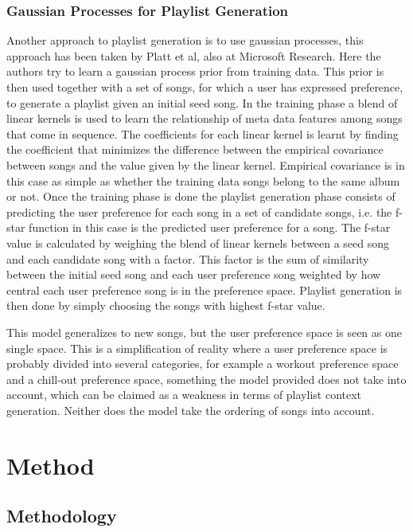 \documentclass[a4paper,11pt]{kth-mag}
\begin{document}
\section{Gaussian Processes for Playlist Generation}
Another approach to playlist generation is to use gaussian processes, this approach has been taken by Platt et al, also at Microsoft Research. Here the authors try to learn a gaussian process prior from training data. This prior is then used together with a set of songs, for which a user has expressed preference, to generate a playlist given an initial seed song. In the training phase a blend of linear kernels is used to learn the relationship of meta data features among songs that come in sequence. The coefficients for each linear kernel is learnt by finding the coefficient that minimizes the difference between the empirical covariance between songs and the value given by the linear kernel. Empirical covariance is in this case as simple as whether the training data songs belong to the same album or not. Once the training phase is done the playlist generation phase consists of predicting the user preference for each song in a set of candidate songs, i.e. the f-star function in this case is the predicted user preference for a song. The f-star value is calculated by weighing the blend of linear kernels between a seed song and each candidate song with a factor. This factor is the sum of similarity between the initial seed song and each user preference song weighted by how central each user preference song is in the preference space. Playlist generation is then done by simply choosing the songs with highest f-star value\cite{platt2001learning}.

This model generalizes to new songs, but the user preference space is seen as one single space. This is a simplification of reality where a user preference space is probably divided into several categories, for example a workout preference space and a chill-out preference space, something the model provided does not take into account, which can be claimed as a weakness in terms of playlist context generation. Neither does the model take the ordering of songs into account.

\part{Method}

\chapter{Methodology}
\end{document}
